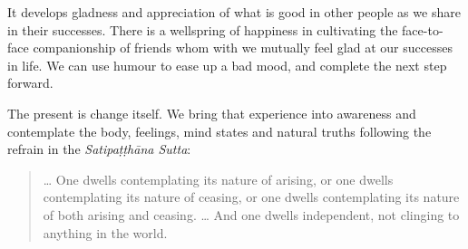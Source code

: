 It develops gladness and appreciation of what is good in other people as
we share in their successes. There is a wellspring of happiness in
cultivating the face-to-face companionship of friends whom with we
mutually feel glad at our successes in life. We can use humour to ease
up a bad mood, and complete the next step forward.

The present is change itself. We bring that experience into awareness
and contemplate the body, feelings, mind states and natural truths
following the refrain in the \emph{Satipaṭṭhāna Sutta}:

\begin{quote}
\ldots{} One dwells contemplating its nature of arising, or one dwells
contemplating its nature of ceasing, or one dwells contemplating its
nature of both arising and ceasing. \ldots{} And one dwells independent,
not clinging to anything in the world.

\bigskip

\end{quote}
